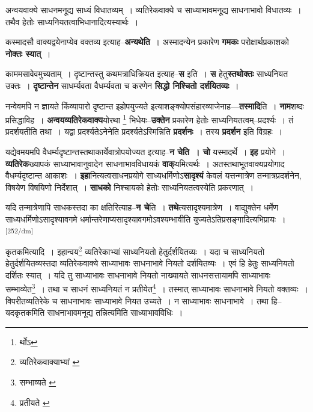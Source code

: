 \documentclass[article,12pt,a4paper]{memoir}
\begin{document}
	  \pstart अन्वयवाक्ये साधनमनूद्य साध्यं विधातव्यम् । व्यतिरेकवाक्ये च साध्याभावमनूद्य साधनाभावो विधातव्यः । तथैव हेतोः साध्यनियतत्वाभिधानादित्यस्यार्थः ।
	\pend
      

	  \pstart कस्मादसौ वाक्यद्वयेनाप्येव वक्तव्य इत्याह--\textbf{अन्यथेति} । अस्मादन्येन प्रकारेण \textbf{गमकः} परोक्षार्थप्रकाशको \textbf{नोक्तः स्यात्} ।
	\pend
      

	  \pstart काममसावेवमुच्यताम् । दृष्टान्तस्तु कथमत्राधिक्रियत इत्याह--\textbf{स} इति । \textbf{स} हेतु\textbf{स्तथोक्तः} साध्यनियत उक्तः । \textbf{दृष्टान्तेन} साधर्म्यवता वैधर्म्यवता च करणेन \textbf{सिद्धो निश्चितो दर्शयितव्यः} ।
	\pend
      

	  \pstart नन्वेवमपि न ज्ञायते किंव्यापारो दृष्टान्त इहोपयुज्यते इत्याशङ्क्योपसंहारव्याजेनाह—\textbf{तस्मादि}ति । \textbf{नाम}शब्दः प्रसिद्धाविह । \textbf{अन्वयव्यतिरेकवाक्य}योरथा \footnote{र्थोऽ} भिधेयः--\textbf{उक्तेन} प्रकारेण हेतोः साध्यनियतत्वम्--प्रदर्श्यः । तं प्रदर्शयतीति तथा । यद्वा प्रदर्श्यतेऽनेनेति प्रदर्श्यतेऽस्मिन्निति \textbf{प्रदर्शनः} । तस्य \textbf{प्रदर्शन} इति विग्रहः ।
	\pend
      

	  \pstart यद्येवमयमपि वैधर्म्यदृष्टान्तस्तथाकार्येवात्रोपयोज्यत इत्याह--\textbf{न चेति । चो} यस्मादर्थे । \textbf{इह} प्रयोगे । \textbf{व्यतिरेक}ख्यापकं साध्याभावानुवादेन साधनाभावविधायकं \textbf{वाक्}यमित्यर्थः । अतस्तथाभूतवाक्यप्रयोगाद वैधर्म्यदृष्टान्त आकाशः । \textbf{इहा}नित्यत्वसाधनप्रयोगे साध्यधर्मिणोऽ\textbf{सादृश्यं} केवलं यत्तन्मात्रेण तन्मात्रप्रदर्शनेन, विषयेण विषयिणो निर्देशात् । \textbf{साधको} निश्चायको हेतोः साध्यनियतत्वस्येति प्रकरणात् ।
	\pend
      

	  \pstart यदि तन्मात्रेणापि साधकस्तदा का क्षतिरित्याह--\textbf{न चे}ति । \textbf{तथे}त्यसादृश्यमात्रेण । वाद्युक्तेन धर्मेण साध्यधर्मिणोऽसादृश्यावगमे धर्मान्तरेणाप्यसादृश्यावगमोऽवश्यम्भावीति युज्यतेऽतिप्रसङ्गादित्यभिप्रायः ।
	\pend
      \leavevmode\textsuperscript{\rmlatinfont\tiny [252/dm]}

	  \pstart कृतकमित्यादि । इहान्वय\footnote{व्यतिरेकवाक्याभ्यां \cite{dp-msA} \cite{dp-msB} \cite{dp-msD} \cite{dp-edP} \cite{dp-edH} \cite{dp-edE} \cite{dp-edN}} व्यतिरेकाभ्यां साध्यनियतो हेतुर्दर्शयितव्यः । यदा च साध्यनियतो हेतुर्दर्शयितव्यस्तदा व्यतिरेकवाक्ये साध्याभावः साधनाभावे नियतो दर्शयितव्यः । एवं हि हेतुः साध्यनियतो दर्शितः स्यात् । यदि तु साध्याभावः साधनाभावे नियतो नाख्यायते साधनसत्तायामपि साध्याभावः सम्भाव्येत\footnote{सम्भाव्यते \cite{dp-msB}} । तथा च साधनं साध्यनियतं न प्रतीयेत\footnote{प्रतीयते \cite{dp-msB} \cite{dp-msC}} । तस्मात् साध्याभावः साधनाभावे नियतो वक्तव्यः । विपरीतव्यतिरेके च साधनाभावः साध्याभावे नियत उच्यते । न साध्याभावः साधनाभावे । तथा हि--यदकृतकमिति साधनाभावमनूद्य तन्नित्यमिति साध्याभावविधिः ।
	\pend
       
\end{document}
